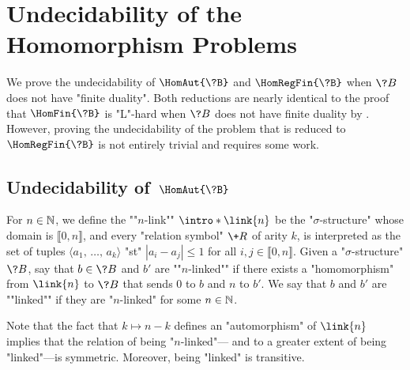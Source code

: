 \section{\AP\label{sec:undecidability}%
	Undecidability of the Homomorphism Problems}


We prove the undecidability of $\HomAut{\?B}$ and $\HomRegFin{\?B}$
when $\?B$ does not have "finite duality". Both reductions are
nearly identical to the proof that $\HomFin{\?B}$ is "L"-hard when $\?B$ does not
have finite duality by \textcite[Theorem 3.2]{LaroseTesson2009UniversalAlgebraCSP}.
However, proving the undecidability of the problem that is reduced
to $\HomRegFin{\?B}$ is not entirely trivial and requires some work.

\subsection{\AP\label{sec:undecidability-hom}%
	Undecidability of \,$\HomAut{\?B}$}

For $n\in\mathbb{N}$, we define the \AP""$n$-link"" $\intro*\link{n}$ be the "$\sigma$-structure" 
whose domain is $\lBrack 0,n\rBrack$, and every "relation symbol" $\+R$
of arity $k$, is interpreted as the set of tuples $\langle a_1,\, \hdots,\, a_k \rangle$
"st" $|a_i-a_j| \leq 1$ for all $i,j \in \lBrack 0,n \rBrack$.
Given a "$\sigma$-structure" $\?B$, say that $b \in \?B$ and $b'$ are
\AP""$n$-linked"" if there exists a "homomorphism" from $\link{n}$ to $\?B$
that sends $0$ to $b$ and $n$ to $b'$. We say that $b$ and $b'$ are \AP""linked"" if
they are "$n$-linked" for some $n \in \mathbb{N}$.

Note that the fact that $k \mapsto n-k$
defines an "automorphism" of $\link{n}$ implies that the relation of being "$n$-linked"---
and to a greater extent of being "linked"---is symmetric.
Moreover, being "linked" is transitive.



